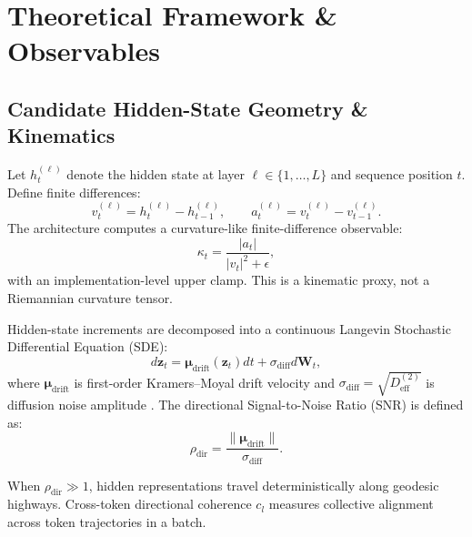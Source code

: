 \documentclass[11pt,twocolumn]{article}
\begin{document}
\section{Theoretical Framework \& Observables}
\subsection{Candidate Hidden-State Geometry \& Kinematics}
Let $h_t^{(\ell)}$ denote the hidden state at layer $\ell \in \{1, \dots, L\}$ and sequence position $t$. Define finite differences:
\begin{equation}
v_t^{(\ell)} = h_t^{(\ell)} - h_{t-1}^{(\ell)}, \qquad a_t^{(\ell)} = v_t^{(\ell)} - v_{t-1}^{(\ell)}.
\end{equation}
The architecture computes a curvature-like finite-difference observable:
\begin{equation}
\kappa_t = \frac{|a_t|}{|v_t|^2 + \epsilon},
\end{equation}
with an implementation-level upper clamp. This is a kinematic proxy, not a Riemannian curvature tensor.

Hidden-state increments are decomposed into a continuous Langevin Stochastic Differential Equation (SDE):
\begin{equation} 
d\mathbf{z}_t = \boldsymbol{\mu}_{\mathrm{drift}}(\mathbf{z}_t) dt + \sigma_{\mathrm{diff}} d\mathbf{W}_t, 
\end{equation}
where $\boldsymbol{\mu}_{\mathrm{drift}}$ is first-order Kramers--Moyal drift velocity and $\sigma_{\mathrm{diff}} = \sqrt{D^{(2)}_{\mathrm{eff}}}$ is diffusion noise amplitude \cite{pawula1967}. The directional Signal-to-Noise Ratio (SNR) is defined as:
\begin{equation}  
\rho_{\mathrm{dir}} = \frac{\|\boldsymbol{\mu}_{\mathrm{drift}}\|}{\sigma_{\mathrm{diff}}}. 
\end{equation}

When $\rho_{\mathrm{dir}} \gg 1$, hidden representations travel deterministically along geodesic highways. Cross-token directional coherence $c_l$ measures collective alignment across token trajectories in a batch.
\end{document}
